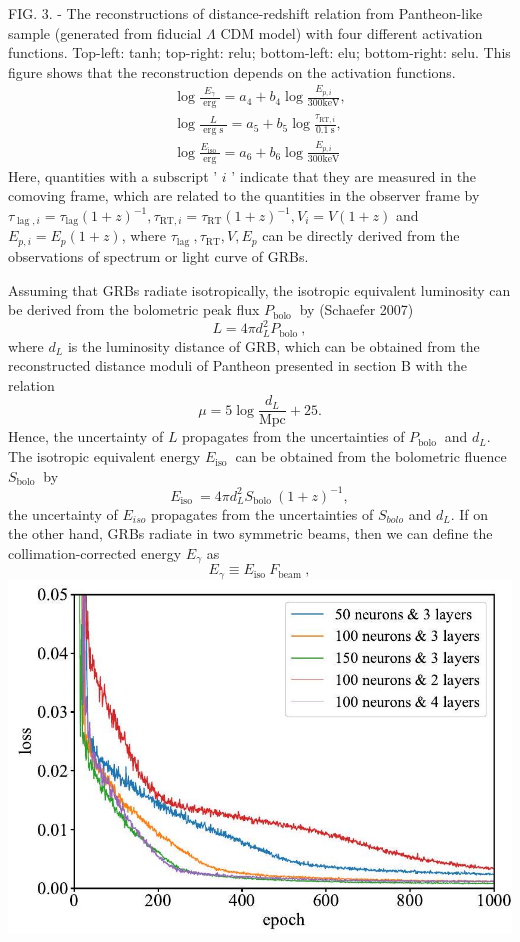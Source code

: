 \documentclass[10pt, a4paper]{article}
\begin{document}
FIG. 3. - The reconstructions of distance-redshift relation from Pantheon-like sample (generated from fiducial $\Lambda$ CDM model) with four different activation functions. Top-left: tanh; top-right: relu; bottom-left: elu; bottom-right: selu. This figure shows that the reconstruction depends on the activation functions.
$$
\begin{gathered}
\log \frac{E_{\gamma}}{\text { erg }}=a_{4}+b_{4} \log \frac{E_{p, i}}{300 \mathrm{keV}}, \\
\log \frac{L}{\text { erg s }}=a_{5}+b_{5} \log \frac{\tau_{\mathrm{RT}, i}}{0.1 \mathrm{~s}}, \\
\log \frac{E_{\text {iso }}}{\text { erg }}=a_{6}+b_{6} \log \frac{E_{p, i}}{300 \mathrm{keV}}
\end{gathered}
$$
Here, quantities with a subscript ' $i$ ' indicate that they are measured in the comoving frame, which are related to the quantities in the observer frame by $\tau_{\operatorname{lag}, i}=\tau_{\operatorname{lag}}(1+z)^{-1}, \tau_{\mathrm{RT}, i}=\tau_{\mathrm{RT}}(1+z)^{-1}, V_{i}=V(1+z)$ and $E_{p, i}=E_{p}(1+z)$, where $\tau_{\text {lag }}, \tau_{\mathrm{RT}}, V, E_{p}$ can be directly derived from the observations of spectrum or light curve of GRBs.

Assuming that GRBs radiate isotropically, the isotropic equivalent luminosity can be derived from the bolometric peak flux $P_{\text {bolo }}$ by (Schaefer 2007)
$$
L=4 \pi d_{L}^{2} P_{\text {bolo }},
$$
where $d_{L}$ is the luminosity distance of GRB, which can be obtained from the reconstructed distance moduli of Pantheon presented in section B with the relation
$$
\mu=5 \log \frac{d_{L}}{\mathrm{Mpc}}+25 .
$$
Hence, the uncertainty of $L$ propagates from the uncertainties of $P_{\text {bolo }}$ and $d_{L}$. The isotropic equivalent energy $E_{\text {iso }}$ can be obtained from the bolometric fluence $S_{\text {bolo }}$ by
$$
E_{\text {iso }}=4 \pi d_{L}^{2} S_{\text {bolo }}(1+z)^{-1},
$$
the uncertainty of $E_{iso}$ propagates from the uncertainties of $S_{bolo}$ and $d_L$. If on the other hand, GRBs radiate in two symmetric beams, then we can define the collimation-corrected energy $E_{\gamma}$ as
$$
E_{\gamma} \equiv E_{\text {iso }} F_{\text {beam }},
$$
\includegraphics[max width=\textwidth]{2022_04_27_cf6124939ea404970a21g-07}
\end{document}
